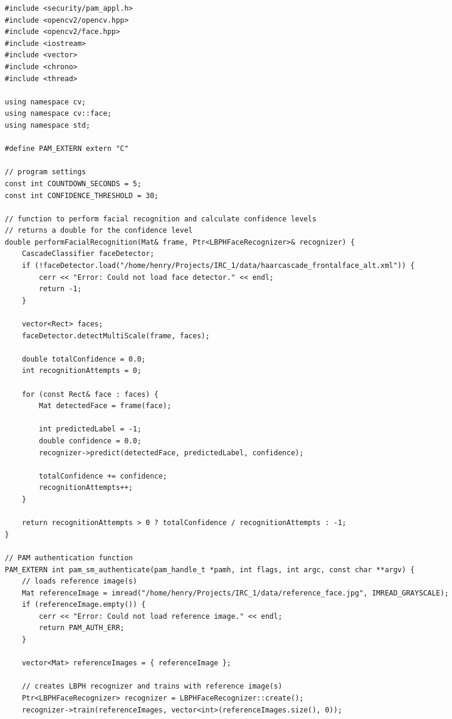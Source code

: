 \documentclass[
]{article}
\begin{document}
\begin{adjustwidth}{-1cm}{-1cm}
\begin{verbatim}
#include <security/pam_appl.h>
#include <opencv2/opencv.hpp>
#include <opencv2/face.hpp>
#include <iostream>
#include <vector>
#include <chrono>
#include <thread>

using namespace cv;
using namespace cv::face;
using namespace std;

#define PAM_EXTERN extern "C"

// program settings
const int COUNTDOWN_SECONDS = 5;
const int CONFIDENCE_THRESHOLD = 30;

// function to perform facial recognition and calculate confidence levels
// returns a double for the confidence level
double performFacialRecognition(Mat& frame, Ptr<LBPHFaceRecognizer>& recognizer) {
    CascadeClassifier faceDetector;
    if (!faceDetector.load("/home/henry/Projects/IRC_1/data/haarcascade_frontalface_alt.xml")) {
        cerr << "Error: Could not load face detector." << endl;
        return -1;
    }

    vector<Rect> faces;
    faceDetector.detectMultiScale(frame, faces);

    double totalConfidence = 0.0;
    int recognitionAttempts = 0;

    for (const Rect& face : faces) {
        Mat detectedFace = frame(face);

        int predictedLabel = -1;
        double confidence = 0.0;
        recognizer->predict(detectedFace, predictedLabel, confidence);

        totalConfidence += confidence;
        recognitionAttempts++;
    }

    return recognitionAttempts > 0 ? totalConfidence / recognitionAttempts : -1;
}

// PAM authentication function
PAM_EXTERN int pam_sm_authenticate(pam_handle_t *pamh, int flags, int argc, const char **argv) {
    // loads reference image(s)
    Mat referenceImage = imread("/home/henry/Projects/IRC_1/data/reference_face.jpg", IMREAD_GRAYSCALE);
    if (referenceImage.empty()) {
        cerr << "Error: Could not load reference image." << endl;
        return PAM_AUTH_ERR;
    }

    vector<Mat> referenceImages = { referenceImage };

    // creates LBPH recognizer and trains with reference image(s)
    Ptr<LBPHFaceRecognizer> recognizer = LBPHFaceRecognizer::create();
    recognizer->train(referenceImages, vector<int>(referenceImages.size(), 0));


\end{verbatim}
\end{adjustwidth}
\end{document}
